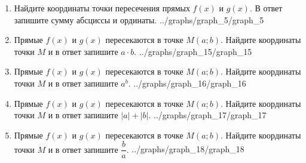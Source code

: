 \documentclass[10pt, a4paper]{article}
\begin{document}
\begin{enumerate}
	\item \funcexer
		{Найдите координаты точки пересечения прямых $f(x)$ и $g(x)$. В ответ запишите сумму абсциссы и ординаты. }
		{../graphs/graph_5/graph_5}
	\item \funcexer
		{Прямые $f(x)$ и $g(x)$ пересекаются в точке $M(a;b)$. Найдите координаты точки $M$ и в ответ запишите $a\cdot b$. }
		{../graphs/graph_15/graph_15}
	\item \funcexer
		{Прямые $f(x)$ и $g(x)$ пересекаются в точке $M(a;b)$. Найдите координаты точки $M$ и в ответ запишите $a^b$. }
		{../graphs/graph_16/graph_16}
	\item \funcexer
		{Прямые $f(x)$ и $g(x)$ пересекаются в точке $M(a;b)$. Найдите координаты точки $M$ и в ответ запишите $|a|+|b|$. }
		{../graphs/graph_17/graph_17}
	\item \funcexer
		{Прямые $f(x)$ и $g(x)$ пересекаются в точке $M(a;b)$. Найдите координаты точки $M$ и в ответ запишите $\dfrac{b}{a}$. }
		{../graphs/graph_18/graph_18}
\end{enumerate}
\end{document}
